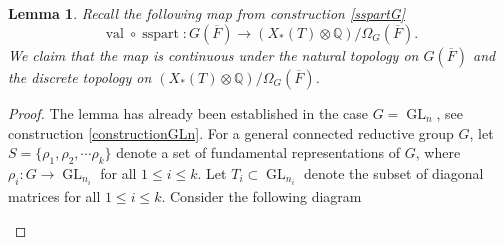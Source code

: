 \documentclass[11pt,a4paper]{article}
\theoremstyle{definition}
\theoremstyle{plain}
\newtheorem{Le}[shared]{Lemma}
\theoremstyle{remark}
\theoremstyle{plain}
\DeclareMathOperator{\GL}{GL}
\DeclareMathOperator{\val}{val}
\DeclareMathOperator{\semisimplepart}{sspart}
\begin{document}
\begin{Le}\label{truncationcontinuous}
    Recall the following map from construction \ref{sspartG}
    $$ \val \circ \semisimplepart: G(\overline{F}) \xrightarrow[]{} (X_*(T) \otimes \mathbb{Q})/\Omega_G(\overline{F}).$$
    We claim that the map is continuous under the natural topology on $G(\overline{F})$ and the discrete topology on $(X_*(T) \otimes \mathbb{Q})/\Omega_G(\overline{F})$.
\end{Le}
\begin{proof}
    The lemma has already been established in the case $G = \GL_n$, see construction \ref{constructionGLn}. For a general connected reductive group $G$, let $S = \{\rho_1, \rho_2, \cdots \rho_k \}$ denote a set of fundamental representations of $G$, where $\rho_i: G \xrightarrow[]{} \GL_{n_i}$ for all $1 \leq i \leq k$. Let $T_i \subset \GL_{n_i}$ denote the subset of diagonal matrices for all $1 \leq i \leq k$. Consider the following diagram
    \begin{center}
    \end{center}

\end{proof}
\end{document}
